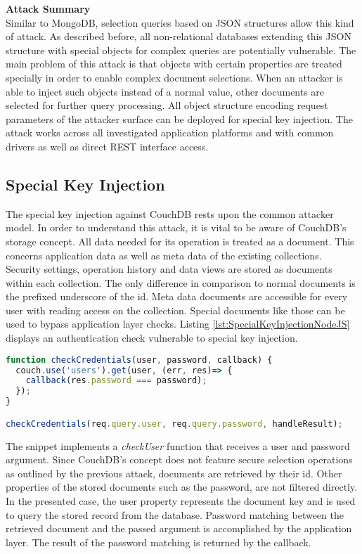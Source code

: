 \textbf{Attack Summary} \\
Similar to MongoDB, selection queries based on JSON structures allow this kind of attack. As described before, all non-relational databases extending this JSON structure with special objects for complex queries are potentially vulnerable. The main problem of this attack is that objects with certain properties are treated specially in order to enable complex document selections. When an attacker is able to inject such objects instead of a normal value, other documents are selected for further query processing. All object structure encoding request parameters of the attacker surface can be deployed for special key injection. The attack works across all investigated application platforms and with common drivers as well as direct REST interface access. 

\subsection{Special Key Injection}
The special key injection against CouchDB rests upon the common attacker model. In order to understand this attack, it is vital to be aware of CouchDB's storage concept. All data needed for its operation is treated as a document. This concerns application data as well as meta data of the existing collections. Security settings, operation history and data views are stored as documents within each collection. The only difference in comparison to normal documents is the prefixed underscore of the id. Meta data documents are accessible for every user with reading access on the collection. Special documents like those can be used to bypass application layer checks. Listing \ref{lst:SpecialKeyInjectionNodeJS} displays an authentication check vulnerable to special key injection. \\

\begin{lstlisting}[caption={Vulnerable NodeJS example for special key injection against CouchDB}, label={lst:SpecialKeyInjectionNodeJS}, language=JavaScript]
function checkCredentials(user, password, callback) {
  couch.use('users').get(user, (err, res)=> {
    callback(res.password === password);
  });
}

checkCredentials(req.query.user, req.query.password, handleResult);
\end{lstlisting}

The snippet implements a \emph{checkUser} function that receives a user and password argument. Since CouchDB's concept does not feature secure selection operations as outlined by the previous attack, documents are retrieved by their id. Other properties of the stored documents such as the password, are not filtered directly. In the presented case, the user property represents the document key and is used to query the stored record from the database. Password matching between the retrieved document and the passed argument is accomplished by the application layer. The result of the password matching is returned by the callback. \\

